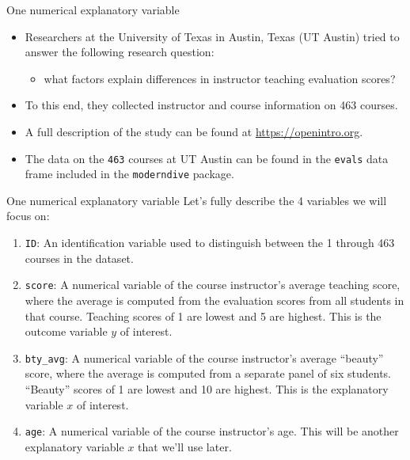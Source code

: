 \documentclass[
  ignorenonframetext,
]{beamer}
\providecommand{\tightlist}{%
  \setlength{\itemsep}{0pt}\setlength{\parskip}{0pt}}
\begin{document}
\begin{frame}[fragile]{One numerical explanatory variable}
\label{one-numerical-explanatory-variable}
\begin{itemize}
\item
  Researchers at the University of Texas in Austin, Texas (UT Austin)
  tried to answer the following research question:

  \begin{itemize}
  \tightlist
  \item
    what factors explain differences in instructor teaching evaluation
    scores?
  \end{itemize}
\item
  To this end, they collected instructor and course information on 463
  courses.
\item
  A full description of the study can be found at
  \url{https://openintro.org}.
\item
  The data on the \texttt{463} courses at UT Austin can be found in the
  \texttt{evals} data frame included in the \texttt{moderndive} package.
\end{itemize}
\end{frame}

\begin{frame}[fragile]{One numerical explanatory variable}
\label{one-numerical-explanatory-variable-1}
Let's fully describe the 4 variables we will focus on:

\begin{enumerate}
\item
  \texttt{ID}: An identification variable used to distinguish between
  the 1 through 463 courses in the dataset.
\item
  \texttt{score}: A numerical variable of the course instructor's
  average teaching score, where the average is computed from the
  evaluation scores from all students in that course. Teaching scores of
  1 are lowest and 5 are highest. This is the outcome variable \(y\) of
  interest.
\item
  \texttt{bty\_avg}: A numerical variable of the course instructor's
  average ``beauty'' score, where the average is computed from a
  separate panel of six students. ``Beauty'' scores of 1 are lowest and
  10 are highest. This is the explanatory variable \(x\) of interest.
\item
  \texttt{age}: A numerical variable of the course instructor's age.
  This will be another explanatory variable \(x\) that we'll use later.
\end{enumerate}
\end{frame}
\end{document}
